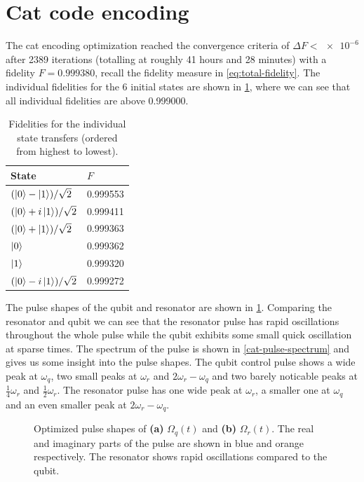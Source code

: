 \documentclass[main.tex]{subfiles}
\begin{document}
\clearpage{}
\section{Cat code encoding}
The cat encoding optimization reached the convergence criteria of \(\Delta F < \num{e-6}\) after 2389 iterations (totalling at roughly 41 hours and 28 minutes) with a fidelity \(F = 0.999380\), recall the fidelity measure in \cref{eq:total-fidelity}.
The individual fidelities for the 6 initial states are shown in \cref{tab:cat-fidelities}, where we can see that all individual fidelities are above 0.999000.

\begin{table}[H]
    \caption{Fidelities for the individual state transfers (ordered from highest to lowest).}%
    \label{tab:cat-fidelities}
    \centering
    \begin{tabular}{@{}ll@{}}
    \toprule
    State & \(F\)\\ \midrule
	\((\ket{0}-\ket{1})/\sqrt{2}\) & 0.999553 \\
	\((\ket{0}+i\ket{1})/\sqrt{2}\) & 0.999411 \\
	\((\ket{0}+\ket{1})/\sqrt{2}\) & 0.999363 \\
    \(\ket{0}\) & 0.999362 \\
	\(\ket{1}\) & 0.999320 \\
	\((\ket{0}-i\ket{1})/\sqrt{2}\) & 0.999272 \\
    \bottomrule
    \end{tabular}
\end{table}

The pulse shapes of the qubit and resonator are shown in \cref{fig:cat-pulse-shape}.
Comparing the resonator and qubit we can see that the resonator pulse has rapid oscillations throughout the whole pulse while the qubit exhibits some small quick oscillation at sparse times.
The spectrum of the pulse is shown in \cref{cat-pulse-spectrum} and gives us some insight into the pulse shapes.
The qubit control pulse shows a wide peak at \(\omega_q\), two small peaks at \(\omega_r\) and \(2\omega_r-\omega_q\) and two barely noticable peaks at \(\frac{1}{4}\omega_r\) and \(\frac{1}{2}\omega_r\). 
The resonator pulse has one wide peak at \(\omega_r\), a smaller one at \(\omega_q\) and an even smaller peak at \(2\omega_r-\omega_q\).

\begin{figure}[ht]
\centering
{}
\caption{%
Optimized pulse shapes of \textbf{(a)} \(\Omega_q(t)\) and \textbf{(b)} \(\Omega_r(t)\).
The real and imaginary parts of the pulse are shown in blue and orange respectively.
The resonator shows rapid oscillations compared to the qubit.
}%
\label{fig:cat-pulse-shape}
\end{figure}
\end{document}
